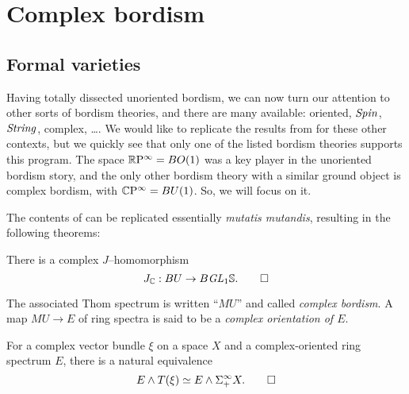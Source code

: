 
\chapter{Complex bordism}\label{ComplexBordismChapter}




\section{Formal varieties}\label{FormalVarietiesLecture}


Having totally dissected unoriented bordism, we can now turn our attention to other sorts of bordism theories, and there are many available: oriented, $\mathit{Spin}$, $\mathit{String}$, complex, \ldots.  We would like to replicate the results from  for these other contexts, but we quickly see that only one of the listed bordism theories supports this program.  The space $\mathbb R\mathrm P^\infty = BO(1)$ was a key player in the unoriented bordism story, and the only other bordism theory with a similar ground object is complex bordism, with $\mathbb{C}\mathrm P^\infty = BU(1)$.  So, we will focus on it.

The contents of  can be replicated essentially \textit{mutatis mutandis}, resulting in the following theorems:
\begin{theorem}
There is a complex $J$--homomorphism \[J_{\mathbb{C}}: BU \to B \mathit{GL}_1 \mathbb S. \qed \]
\end{theorem}

\begin{definition}
The associated Thom spectrum is written ``$MU$'' and called \textit{complex bordism}.  A map $MU \to E$ of ring spectra is said to be a \textit{complex orientation of $E$}.
\end{definition}

\begin{theorem}\label{ThomIsomOverC}
For a complex vector bundle $\xi$ on a space $X$ and a complex-oriented ring spectrum $E$, there is a natural equivalence \[E \wedge T(\xi) \simeq E \wedge \Sigma^\infty_+ X. \qed\]
\end{theorem}

